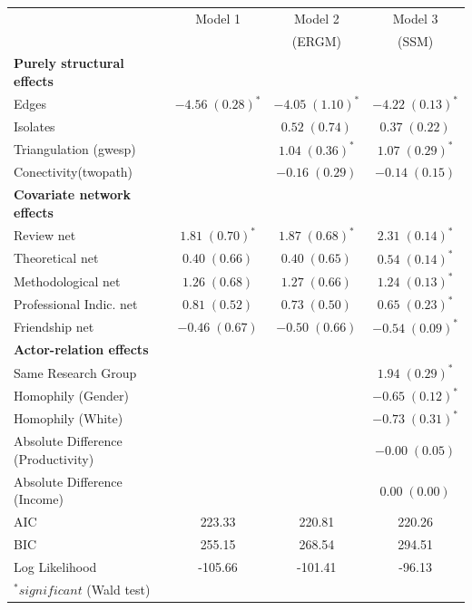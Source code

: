 \documentclass[a4paper, 12pt, openright, oneside, article, german, french, brazil, english]{abntex2}
\begin{document}
\begin{table}[!h]
{\begin{tabular}{l c c c }
\hline
 & Model 1 & Model 2 & Model 3 \\
 &         & (ERGM) & (SSM) \\
\hline
\textbf{Purely structural effects} & & & \\
Edges  				  & $-4.56 \; (0.28)^{*}$ & $-4.05 \; (1.10)^{*}$ & $-4.22 \; (0.13)^{*}$ \\
Isolates              &                         & $0.52 \; (0.74)$        & $0.37 \; (0.22)$        \\
Triangulation (gwesp) &                         & $1.04 \; (0.36)^{*}$   & $1.07 \; (0.29)^{*}$  \\
Conectivity(twopath)  &                         & $-0.16 \; (0.29)$       & $-0.14 \; (0.15)$       \\
\textbf{Covariate network effects} & & & \\
Review net            & $1.81 \; (0.70)^{*}$   & $1.87 \; (0.68)^{*}$   & $2.31 \; (0.14)^{*}$  \\
Theoretical net       & $0.40 \; (0.66)$        & $0.40 \; (0.65)$        & $0.54 \; (0.14)^{*}$  \\
Methodological net    & $1.26 \; (0.68)$        & $1.27 \; (0.66)$        & $1.24 \; (0.13)^{*}$  \\
Professional Indic. net & $0.81 \; (0.52)$        & $0.73 \; (0.50)$        & $0.65 \; (0.23)^{*}$   \\
Friendship net        & $-0.46 \; (0.67)$       & $-0.50 \; (0.66)$       & $-0.54 \; (0.09)^{*}$ \\
\textbf{Actor-relation effects} & & & \\
Same Research Group        &                         &                    & $1.94 \; (0.29)^{*}$  \\
Homophily (Gender)        &                         &                     & $-0.65 \; (0.12)^{*}$ \\
Homophily (White)         &                         &                     & $-0.73 \; (0.31)^{*}$   \\
Absolute Difference (Productivity) &            &                         & $-0.00 \; (0.05)$       \\
Absolute Difference (Income)       &            &                         & $0.00 \; (0.00)$        \\
\hline
AIC                   & 223.33                  & 220.81                  & 220.26                  \\
BIC                   & 255.15                  & 268.54                  & 294.51                  \\
Log Likelihood        & -105.66                 & -101.41                 & -96.13                  \\
\hline
\multicolumn{4}{l}{\scriptsize{$^*significant$ (Wald test)}}
\end{tabular}
}
{}
\end{table}
\end{document}
